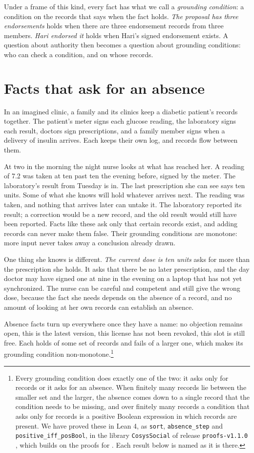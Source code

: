 Under a frame of this kind, every fact has what we call a \emph{grounding condition}: a condition on
the records that says when the fact holds. \emph{The proposal has three endorsements} holds when
there are three endorsement records from three members. \emph{Hari endorsed it} holds when Hari's
signed endorsement exists. A question about authority then becomes a question about grounding
conditions: who can check a condition, and on whose records.

\section{Facts that ask for an absence}\label{sec:sort}

In an imagined clinic, a family and its clinics keep a diabetic patient's records together. The
patient's meter signs each glucose reading, the laboratory signs each result, doctors sign
prescriptions, and a family member signs when a delivery of insulin arrives. Each keeps their own
log, and records flow between them.

At two in the morning the night nurse looks at what has reached her. A reading of 7.2 was taken at
ten past ten the evening before, signed by the meter. The laboratory's result from Tuesday is in.
The last prescription she can see says ten units. Some of what she knows will hold whatever arrives
next. The reading was taken, and nothing that arrives later can untake it. The laboratory reported
its result; a correction would be a new record, and the old result would still have been reported.
Facts like these ask only that certain records exist, and adding records can never make them false.
Their grounding conditions are monotone: more input never takes away a conclusion already drawn.

One thing she knows is different. \emph{The current dose is ten units} asks for more than the
prescription she holds. It asks that there be no later prescription, and the day doctor may have
signed one at nine in the evening on a laptop that has not yet synchronized. The nurse can be careful
and competent and still give the wrong dose, because the fact she needs depends on the absence of a
record, and no amount of looking at her own records can establish an absence.

Absence facts turn up everywhere once they have a name: no objection remains open, this is the
latest version, this license has not been revoked, this slot is still free. Each holds of some set
of records and fails of a larger one, which makes its grounding condition non-monotone.\footnote{Every
grounding condition does exactly one of the two: it asks only for records or it asks for an absence.
When finitely many records lie between the smaller set and the larger, the absence comes down to a
single record that the condition needs to be missing, and over finitely many records a condition
that asks only for records is a positive Boolean expression in which records are present. We have
proved these in Lean 4, as \texttt{sort}, \texttt{absence\_step} and \texttt{positive\_iff\_posBool},
in the library \texttt{CosysSocial} of release \texttt{proofs-v1.1.0} \citep{karna2026social}, which
builds on the proofs for \citet{karna2026}. Each result below is named as it is there.}

